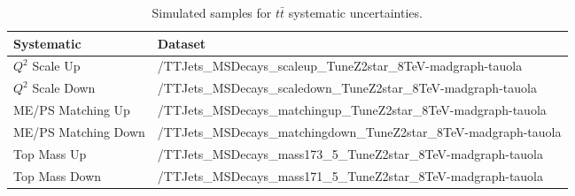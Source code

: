 \begin{sidewaystable}
\begin{center}
\begin{tabular}{|l|l|} %
\hline
	Systematic & Dataset \\
\hline
$Q^2$ Scale Up & /TTJets\_MSDecays\_scaleup\_TuneZ2star\_8TeV-madgraph-tauola \\
$Q^2$ Scale Down & /TTJets\_MSDecays\_scaledown\_TuneZ2star\_8TeV-madgraph-tauola \\
\hline
ME/PS Matching Up & /TTJets\_MSDecays\_matchingup\_TuneZ2star\_8TeV-madgraph-tauola \\
ME/PS Matching Down & /TTJets\_MSDecays\_matchingdown\_TuneZ2star\_8TeV-madgraph-tauola \\
\hline
Top Mass Up & /TTJets\_MSDecays\_mass173\_5\_TuneZ2star\_8TeV-madgraph-tauola \\
Top Mass Down & /TTJets\_MSDecays\_mass171\_5\_TuneZ2star\_8TeV-madgraph-tauola \\
\hline
\end{tabular}
\end{center}
\caption{Simulated samples for $t\bar{t}$ systematic uncertainties.}
\label{tab-systsamples}
\end{sidewaystable}